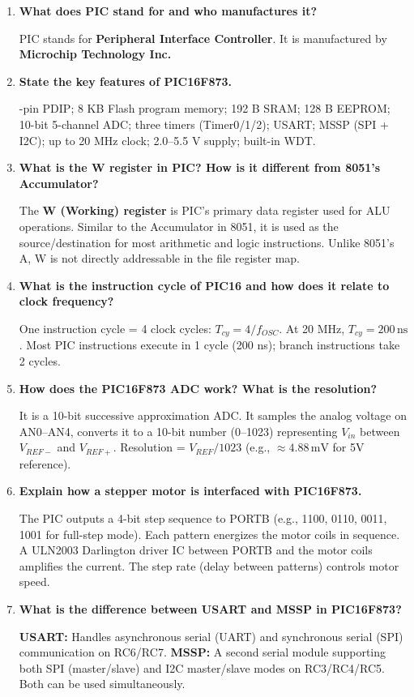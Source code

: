 \documentclass[12pt,a4paper]{article}
\newcommand{\Q}[1]{\textbf{#1}\par\noindent\ignorespaces}
\begin{document}
\begin{tcolorbox}[exambox, title={\textbf{Frequently Asked / Viva Questions}}]
\begin{enumerate}[topsep=0pt, label=\textbf{Q\arabic*.}, itemsep=5pt]
  \item \Q{What does PIC stand for and who manufactures it?}
    PIC stands for \textbf{Peripheral Interface Controller}. It is manufactured by \textbf{Microchip Technology Inc.}
  \item \Q{State the key features of PIC16F873.}
    28-pin PDIP; 8 KB Flash program memory; 192 B SRAM; 128 B EEPROM; 10-bit 5-channel ADC; three timers (Timer0/1/2); USART; MSSP (SPI + I2C); up to 20 MHz clock; 2.0--5.5 V supply; built-in WDT.
  \item \Q{What is the W register in PIC? How is it different from 8051's Accumulator?}
    The \textbf{W (Working) register} is PIC's primary data register used for ALU operations. Similar to the Accumulator in 8051, it is used as the source/destination for most arithmetic and logic instructions. Unlike 8051's A, W is not directly addressable in the file register map.
  \item \Q{What is the instruction cycle of PIC16 and how does it relate to clock frequency?}
    One instruction cycle = 4 clock cycles: $T_{cy} = 4/f_{OSC}$. At 20 MHz, $T_{cy} = 200\,\text{ns}$. Most PIC instructions execute in 1 cycle (200 ns); branch instructions take 2 cycles.
  \item \Q{How does the PIC16F873 ADC work? What is the resolution?}
    It is a 10-bit successive approximation ADC. It samples the analog voltage on AN0--AN4, converts it to a 10-bit number (0--1023) representing $V_{in}$ between $V_{REF-}$ and $V_{REF+}$. Resolution = $V_{REF}/1023$ (e.g., $\approx 4.88\,\text{mV}$ for 5V reference).
  \item \Q{Explain how a stepper motor is interfaced with PIC16F873.}
    The PIC outputs a 4-bit step sequence to PORTB (e.g., 1100, 0110, 0011, 1001 for full-step mode). Each pattern energizes the motor coils in sequence. A ULN2003 Darlington driver IC between PORTB and the motor coils amplifies the current. The step rate (delay between patterns) controls motor speed.
  \item \Q{What is the difference between USART and MSSP in PIC16F873?}
    \textbf{USART:} Handles asynchronous serial (UART) and synchronous serial (SPI) communication on RC6/RC7. \textbf{MSSP:} A second serial module supporting both SPI (master/slave) and I2C master/slave modes on RC3/RC4/RC5. Both can be used simultaneously.

\end{enumerate}
\end{tcolorbox}
\end{document}
